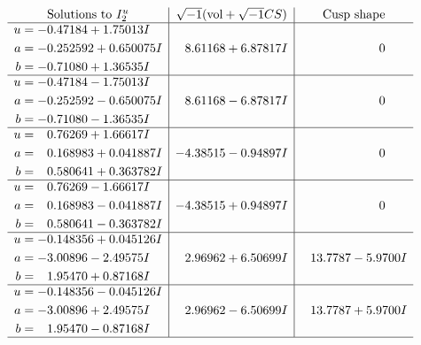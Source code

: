 \documentclass[1p]{elsarticle_modified}
\theoremstyle{definition}
\newcommand{\I}{\sqrt{-1}}
\begin{document}
$$\begin{array}{c|c|c}
\text{Solutions to }I^u_{2}& \I (\text{vol} + \sqrt{-1}CS) & \text{Cusp shape}\\
 \hline 
\begin{aligned}
u &= -0.47184 + 1.75013 I \\
a &= -0.252592 + 0.650075 I \\
b &= -0.71080 + 1.36535 I\end{aligned}
 & \phantom{-}8.61168 + 6.87817 I & \phantom{-0.000000 } 0 \\ \hline\begin{aligned}
u &= -0.47184 - 1.75013 I \\
a &= -0.252592 - 0.650075 I \\
b &= -0.71080 - 1.36535 I\end{aligned}
 & \phantom{-}8.61168 - 6.87817 I & \phantom{-0.000000 } 0 \\ \hline\begin{aligned}
u &= \phantom{-}0.76269 + 1.66617 I \\
a &= \phantom{-}0.168983 + 0.041887 I \\
b &= \phantom{-}0.580641 + 0.363782 I\end{aligned}
 & -4.38515 - 0.94897 I & \phantom{-0.000000 } 0 \\ \hline\begin{aligned}
u &= \phantom{-}0.76269 - 1.66617 I \\
a &= \phantom{-}0.168983 - 0.041887 I \\
b &= \phantom{-}0.580641 - 0.363782 I\end{aligned}
 & -4.38515 + 0.94897 I & \phantom{-0.000000 } 0 \\ \hline\begin{aligned}
u &= -0.148356 + 0.045126 I \\
a &= -3.00896 - 2.49575 I \\
b &= \phantom{-}1.95470 + 0.87168 I\end{aligned}
 & \phantom{-}2.96962 + 6.50699 I & \phantom{-}13.7787 - 5.9700 I \\ \hline\begin{aligned}
u &= -0.148356 - 0.045126 I \\
a &= -3.00896 + 2.49575 I \\
b &= \phantom{-}1.95470 - 0.87168 I\end{aligned}
 & \phantom{-}2.96962 - 6.50699 I & \phantom{-}13.7787 + 5.9700 I\\
 \hline 
 \end{array}$$\newpage\newpage\renewcommand{\arraystretch}{1}
\end{document}
